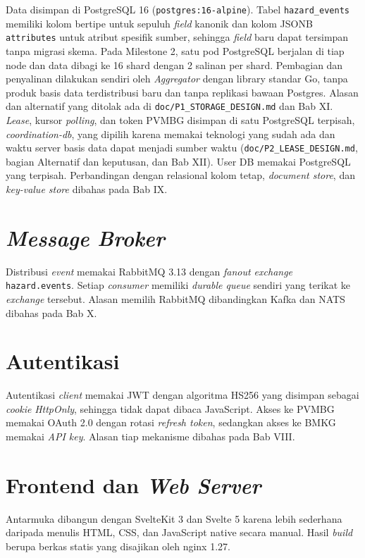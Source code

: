 Data disimpan di PostgreSQL 16 (\texttt{postgres:16-alpine}). Tabel \texttt{hazard\_events} memiliki kolom bertipe untuk sepuluh \textit{field} kanonik dan kolom JSONB \texttt{attributes} untuk atribut spesifik sumber, sehingga \textit{field} baru dapat tersimpan tanpa migrasi skema. Pada Milestone 2, satu pod PostgreSQL berjalan di tiap node dan data dibagi ke 16 shard dengan 2 salinan per shard. Pembagian dan penyalinan dilakukan sendiri oleh \textit{Aggregator} dengan library standar Go, tanpa produk basis data terdistribusi baru dan tanpa replikasi bawaan Postgres. Alasan dan alternatif yang ditolak ada di \texttt{doc/P1\_STORAGE\_DESIGN.md} dan Bab XI. \textit{Lease}, kursor \textit{polling}, dan token PVMBG disimpan di satu PostgreSQL terpisah, \textit{coordination-db}, yang dipilih karena memakai teknologi yang sudah ada dan waktu server basis data dapat menjadi sumber waktu (\texttt{doc/P2\_LEASE\_DESIGN.md}, bagian Alternatif dan keputusan, dan Bab XII). User DB memakai PostgreSQL yang terpisah. Perbandingan dengan relasional kolom tetap, \textit{document store}, dan \textit{key-value store} dibahas pada Bab IX.

\section{\textit{Message Broker}}

Distribusi \textit{event} memakai RabbitMQ 3.13 dengan \textit{fanout exchange} \texttt{hazard.events}. Setiap \textit{consumer} memiliki \textit{durable queue} sendiri yang terikat ke \textit{exchange} tersebut. Alasan memilih RabbitMQ dibandingkan Kafka dan NATS dibahas pada Bab X.

\section{Autentikasi}

Autentikasi \textit{client} memakai JWT dengan algoritma HS256 yang disimpan sebagai \textit{cookie} \textit{HttpOnly}, sehingga tidak dapat dibaca JavaScript. Akses ke PVMBG memakai OAuth 2.0 dengan rotasi \textit{refresh token}, sedangkan akses ke BMKG memakai \textit{API key}. Alasan tiap mekanisme dibahas pada Bab VIII.

\section{Frontend dan \textit{Web Server}}

Antarmuka dibangun dengan SvelteKit 3 dan Svelte 5 karena lebih sederhana daripada menulis HTML, CSS, dan JavaScript native secara manual. Hasil \textit{build} berupa berkas statis yang disajikan oleh nginx 1.27.

